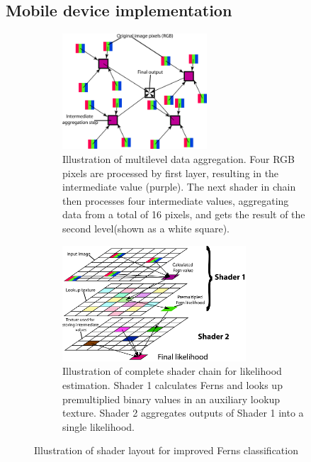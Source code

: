 \subsection{Mobile device implementation}
\label{implementation}
\begin{figure}[ht]

    \centering

	\begin{subfigure}[b]{.37\linewidth}
	   \includegraphics[height=1.7in]{images/Shader1c.png}
\caption{Illustration of multilevel data aggregation. Four RGB pixels are processed by first layer, resulting in the intermediate value (purple). The next shader in chain then processes four intermediate values, aggregating data from a total of 16 pixels, and gets the result of the second level(shown as a white square).}
\label{eps1}
\end{subfigure} 
	\begin{subfigure}[b]{.37\linewidth}
	   \includegraphics[height=1.7in]{images/Shader2c.png}
\caption{Illustration of complete shader chain for likelihood estimation. Shader 1 calculates Ferns and looks up premultiplied binary values in an auxiliary lookup texture. Shader 2 aggregates outputs of Shader 1 into a single likelihood.}
\label{eps2}
\end{subfigure}

    \caption{ Illustration of shader layout for improved Ferns classification}
\label{shaders}
\end{figure}

